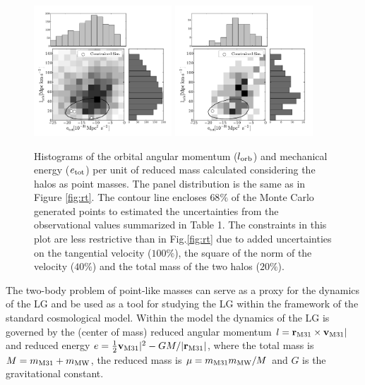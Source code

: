 \documentclass{emulateapj}
\begin{document}
\begin{figure}
\begin{center}
\includegraphics[keepaspectratio=true,width=0.46\textwidth]{./figures/test_EJ_BDM.pdf}
\includegraphics[keepaspectratio=true,width=0.46\textwidth]{./figures/test_EJ_BDM_narrow.pdf}
\caption{Histograms of the orbital angular momentum ($l_{\rm orb}$)
  and mechanical energy ($e_{\rm tot}$) per unit of reduced mass
  calculated considering the halos as point masses. The panel
  distribution is the same as in Figure \ref{fig:rt}. The contour line
  encloses $68\%$ of the Monte Carlo generated points to estimated the
  uncertainties from the observational values summarized in Table
  1. The constraints in this plot are less restrictive than in
  Fig.\ref{fig:rt} due to added uncertainties on the tangential
  velocity ($100\%$), the square of the norm of the velocity ($40\%$)
  and the total mass of the two halos ($20\%$). } 
\label{fig:EJ}
\end{center}
\end{figure}


The two-body problem of point-like masses can serve as a proxy for the
dynamics of the LG and be used as a tool for  studying the LG within
the framework of the standard cosmological model. Within the model the
dynamics of the LG is governed by the (center of mass)  reduced
angular momentum $l= {{\bf r}_{\rm M31}}\times{\bf v}_{\rm M31}|$ and
reduced energy  $e=\frac{1}{2} {\bf v}_{\rm M31}|^2 - G M/|{\bf
  r}_{\rm M31}|$,  where the total mass is $M=m_{\rm M31}+m_{\rm MW}$,
the reduced mass is $\mu=m_{\rm M31}m_{\rm MW}/M$ and $G$ is the
gravitational constant.  
\end{document}
